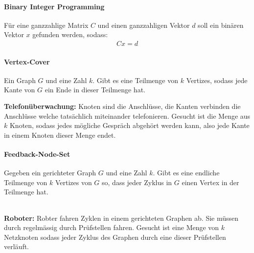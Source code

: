 \paragraph{Binary Integer Programming} Für eine ganzzahlige Matrix \(C\) und einen ganzzahligen Vektor \(d\) soll ein binären Vektor \(x\) gefunden werden, sodass:
\begin{align*}
    Cx = d
\end{align*}
\paragraph{Vertex-Cover} Ein Graph \(G\) und eine Zahl \(k\). Gibt es eine Teilmenge von \(k\) Vertizes, sodass jede Kante von \(G\) ein Ende in dieser Teilmenge hat.\\
\textbf{Telefonüberwachung:} Knoten sind die Anschlüsse, die Kanten verbinden die Anschlüsse welche tatsächlich miteinander telefonieren. Gesucht ist die Menge  aus\(k\) Knoten, sodass jedes mögliche Gespräch abgehört werden kann, also jede Kante in einem Knoten dieser Menge endet.
\paragraph{Feedback-Node-Set} Gegeben ein gerichteter Graph \(G\) und eine Zahl \(k\). Gibt es eine endliche Teilmenge von \(k\) Vertizes von \(G\) so, dass jeder Zyklus in \(G\) einen Vertex in der Teilmenge hat.\\
\\
\textbf{Roboter:} Robter fahren Zyklen in einem gerichteten Graphen ab. Sie müssen durch regelmässig durch Prüfstellen fahren. Gesucht ist eine Menge von \(k\) Netzknoten sodass jeder Zyklus des Graphen durch eine dieser Prüfstellen verläuft.
